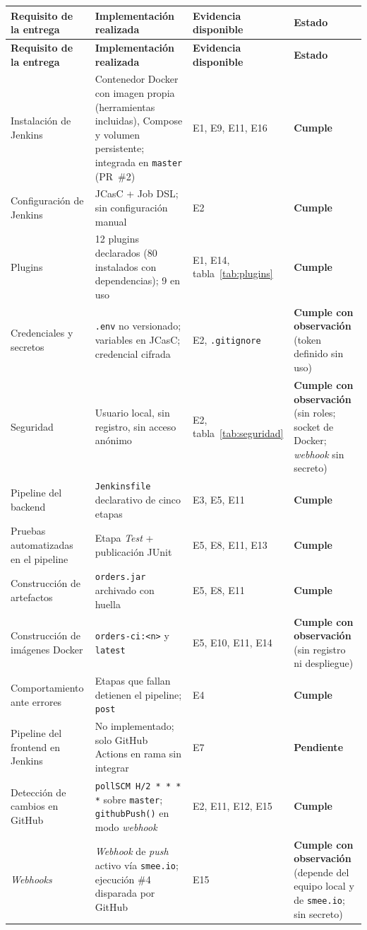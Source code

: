\documentclass[11pt,a4paper]{article}
\newcommand{\ok}{\textcolor{ok}{\textbf{Cumple}}}
\newcommand{\parcial}{\textcolor{warn}{\textbf{Cumple con observación}}}
\newcommand{\pend}{\textcolor{bad}{\textbf{Pendiente}}}
\begin{document}
\begin{longtable}{@{}P{3.4cm} P{4.6cm} P{3.6cm} P{2.7cm}@{}}
\toprule
\textbf{Requisito de la entrega} & \textbf{Implementación realizada} & \textbf{Evidencia disponible} &
\textbf{Estado}\\
\midrule
\endfirsthead
\toprule
\textbf{Requisito de la entrega} & \textbf{Implementación realizada} & \textbf{Evidencia disponible} &
\textbf{Estado}\\
\midrule
\endhead
Instalación de Jenkins & Contenedor Docker con imagen propia (herramientas incluidas), Compose y
volumen persistente; integrada en \texttt{master} (PR~\#2) &
E1, E9, E11, E16 & \ok\\
Configuración de Jenkins & JCasC + Job DSL; sin configuración manual & E2 & \ok\\
Plugins & 12 plugins declarados (80 instalados con dependencias); 9 en uso & E1, E14, tabla~\ref{tab:plugins} & \ok\\
Credenciales y secretos & \texttt{.env} no versionado; variables en JCasC; credencial cifrada &
E2, \texttt{.gitignore} & \parcial{} (token definido sin uso)\\
Seguridad & Usuario local, sin registro, sin acceso anónimo & E2, tabla~\ref{tab:seguridad} &
\parcial{} (sin roles; socket de Docker; \emph{webhook} sin secreto)\\
Pipeline del backend & \texttt{Jenkinsfile} declarativo de cinco etapas & E3, E5, E11 & \ok\\
Pruebas automatizadas en el pipeline & Etapa \emph{Test} + publicación JUnit & E5, E8, E11, E13 & \ok\\
Construcción de artefactos & \texttt{orders.jar} archivado con huella & E5, E8, E11 & \ok\\
Construcción de imágenes Docker & \texttt{orders-ci:<n>} y \texttt{latest} & E5, E10, E11, E14 &
\parcial{} (sin registro ni despliegue)\\
Comportamiento ante errores & Etapas que fallan detienen el pipeline; \texttt{post} & E4 & \ok\\
Pipeline del frontend en Jenkins & No implementado; solo GitHub Actions en rama sin integrar & E7 &
\pend\\
Detección de cambios en GitHub & \texttt{pollSCM H/2 * * * *} sobre \texttt{master}; \texttt{githubPush()} en modo \emph{webhook} & E2, E11, E12, E15 &
\ok\\
\emph{Webhooks} & \emph{Webhook} de \emph{push} activo vía \texttt{smee.io}; ejecución \#4 disparada por GitHub & E15 & \parcial{} (depende del equipo local y de \texttt{smee.io}; sin secreto)\\

\end{longtable}
\end{document}
